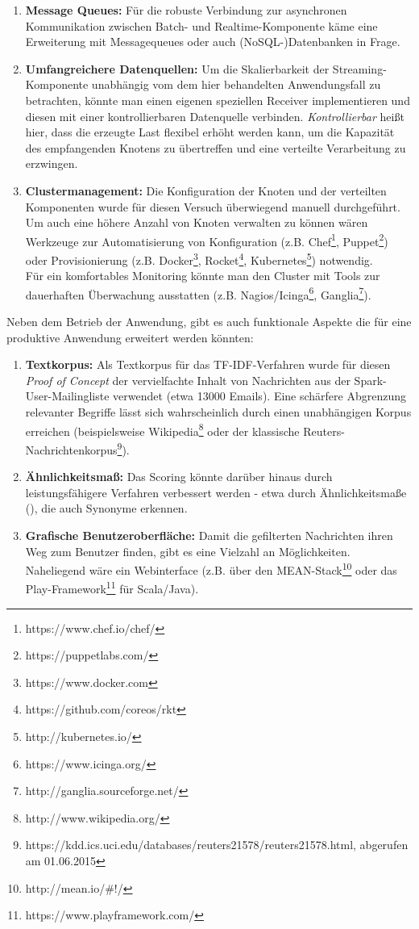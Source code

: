 \begin{enumerate}
	\item \textbf{Message Queues:} Für die robuste Verbindung zur asynchronen Kommunikation zwischen Batch- und Realtime-Komponente käme eine Erweiterung mit Messagequeues oder auch (NoSQL-)Datenbanken in Frage.
	\item \textbf{Umfangreichere Datenquellen:} Um die Skalierbarkeit der Streaming-Komponente unabhängig vom dem hier behandelten Anwendungsfall zu betrachten, könnte man einen eigenen speziellen Receiver implementieren und diesen mit einer kontrollierbaren Datenquelle verbinden. \textit{Kontrollierbar} heißt hier, dass die erzeugte Last flexibel erhöht werden kann, um die Kapazität des empfangenden Knotens zu übertreffen und eine verteilte Verarbeitung zu erzwingen.
	\item \textbf{Clustermanagement:} Die Konfiguration der Knoten und der verteilten Komponenten wurde für diesen Versuch überwiegend manuell durchgeführt. Um auch eine höhere Anzahl von Knoten verwalten zu können wären Werkzeuge zur Automatisierung von Konfiguration (z.B. Chef\footnote{https://www.chef.io/chef/}, Puppet\footnote{https://puppetlabs.com/}) oder Provisionierung (z.B. Docker\footnote{https://www.docker.com}, Rocket\footnote{https://github.com/coreos/rkt}, Kubernetes\footnote{http://kubernetes.io/}) notwendig.\\
	Für ein komfortables Monitoring könnte man den Cluster mit Tools zur dauerhaften Überwachung ausstatten (z.B. Nagios/Icinga\footnote{https://www.icinga.org/}, Ganglia\footnote{http://ganglia.sourceforge.net/}).
\end{enumerate}

Neben dem Betrieb der Anwendung, gibt es auch funktionale Aspekte die für eine produktive Anwendung erweitert werden könnten:

\begin{enumerate}
	\item \textbf{Textkorpus:} Als Textkorpus für das TF-IDF-Verfahren wurde für diesen \textit{Proof of Concept} der vervielfachte Inhalt von Nachrichten aus der Spark-User-Mailingliste verwendet (etwa 13000 Emails). Eine schärfere Abgrenzung relevanter Begriffe lässt sich wahrscheinlich durch einen unabhängigen Korpus erreichen (beispielsweise Wikipedia\footnote{http://www.wikipedia.org/} oder der klassische Reuters-Nachrichtenkorpus\footnote{https://kdd.ics.uci.edu/databases/reuters21578/reuters21578.html, abgerufen am 01.06.2015}).
	\item \textbf{Ähnlichkeitsmaß:} Das Scoring könnte darüber hinaus durch leistungsfähigere Verfahren verbessert werden - etwa durch Ähnlichkeitsmaße (\cite{Huang:2008}), die auch Synonyme erkennen.
	\item \textbf{Grafische Benutzeroberfläche:} Damit die gefilterten Nachrichten ihren Weg zum Benutzer finden, gibt es eine Vielzahl an Möglichkeiten. Naheliegend wäre ein Webinterface (z.B. über den MEAN-Stack\footnote{http://mean.io/#!/} oder das Play-Framework\footnote{https://www.playframework.com/} für Scala/Java).
\end{enumerate}


